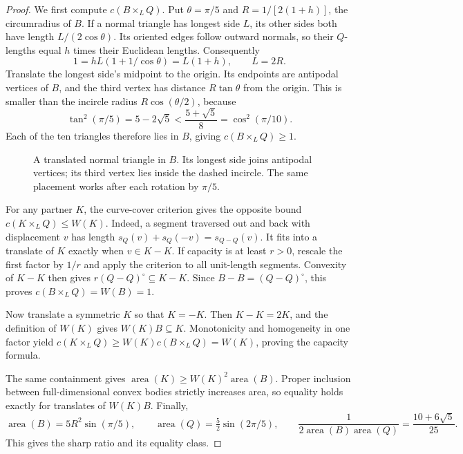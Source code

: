 \begin{proof}
We first compute $c(B\times_L Q)$. Put $\theta=\pi/5$ and
$R=1/[2(1+h)]$, the circumradius of $B$.
If a normal triangle has longest side $L$, its other sides both have length
$L/(2\cos\theta)$. Its oriented edges follow outward normals, so their
$Q$-lengths equal $h$ times their Euclidean lengths. Consequently
\[
 1=hL(1+1/\cos\theta)=L(1+h),\qquad L=2R.
\]
Translate the longest side's midpoint to the origin. Its endpoints are
antipodal vertices of $B$, and the third vertex has distance $R\tan\theta$
from the origin. This is smaller than the incircle radius $R\cos(\theta/2)$,
because
\[
 \tan^2(\pi/5)=5-2\sqrt5
       <\frac{5+\sqrt5}{8}=\cos^2(\pi/10).
\]
Each of the ten triangles therefore lies in $B$, giving $c(B\times_L Q)\ge1$.

\begin{figure}[H]
\centering
{}
\caption{A translated normal triangle in $B$. Its longest side joins
antipodal vertices; its third vertex lies inside the dashed incircle.
The same placement works after each rotation by $\pi/5$.}
\end{figure}

For any partner $K$, the curve-cover criterion gives the opposite bound
$c(K\times_L Q)\le W(K)$. Indeed, a segment traversed out and back with
displacement $v$ has length
$s_Q(v)+s_Q(-v)=s_{Q-Q}(v)$.
It fits into a translate of $K$ exactly when $v\in K-K$.
If capacity is at least $r>0$, rescale the first factor by $1/r$ and apply
the criterion to all unit-length segments. Convexity of $K-K$ then gives
$r(Q-Q)^\circ\subseteq K-K$.
Since $B-B=(Q-Q)^\circ$, this proves $c(B\times_L Q)=W(B)=1$.

Now translate a symmetric $K$ so that $K=-K$. Then $K-K=2K$, and the
definition of $W(K)$ gives $W(K)B\subseteq K$.
Monotonicity and homogeneity in one factor yield
$c(K\times_L Q)\ge W(K)c(B\times_L Q)=W(K)$,
proving the capacity formula.

The same containment gives
$\operatorname{area}(K)\ge W(K)^2\operatorname{area}(B)$.
Proper inclusion between full-dimensional convex bodies strictly increases
area, so equality holds exactly for translates of $W(K)B$.
Finally,
\[
 \operatorname{area}(B)=5R^2\sin(\pi/5),\qquad
 \operatorname{area}(Q)=\tfrac52\sin(2\pi/5),\qquad
 \frac1{2\operatorname{area}(B)\operatorname{area}(Q)}
    =\frac{10+6\sqrt5}{25}.
\]
This gives the sharp ratio and its equality class.
\end{proof}

